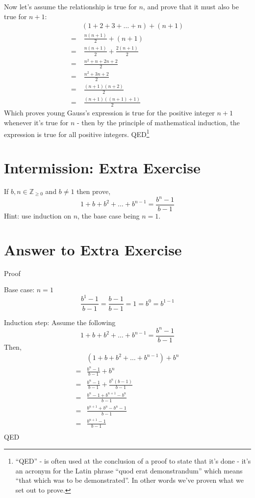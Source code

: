 \documentclass{article}
\begin{document}
Now let's assume the relationship is true for $n$,
and prove that it must also be true for $n+1$:
\begin{align*}
&(1+2+3+\ldots+n) + (n+1)\\
= & \; \frac{n(n+1)}{2} + (n+1)\\
= & \; \frac{n(n+1)}{2} + \frac{2(n+1)}{2}\\
= & \; \frac{n^2+n+2n+2}{2}\\
= & \; \frac{n^2+3n+2}{2}\\
= & \; \frac{(n+1)(n+2)}{2}\\
= & \; \frac{(n+1)((n+1)+1)}{2}
\end{align*}
Which proves young Gauss's expression is true for
the positive integer $n+1$ whenever it's true for $n$ - then
by the principle of mathematical induction,
the expression is true for all positive integers. QED\footnote{``QED'' - is often used at the conclusion of a proof to state that it’s
done - it’s an acronym for the Latin phrase ``quod erat demonstrandum'' which means ``that which was to be demonstrated''.
In other words we’ve proven what we set out to prove.}

\section*{Intermission: Extra Exercise}

If $b, n \in \mathbb{Z}_{\ge 0}$ and $b\ne1$ then prove,
\[1+b+b^2+\dots+b^{n-1} = \frac{b^n-1}{b-1}\]
Hint: use induction on $n$, the base case being $n=1$.

\section*{Answer to Extra Exercise}
Proof

Base case: $n=1$
\[\frac{b^1-1}{b-1}=\frac{b-1}{b-1}=1=b^0=b^{1-1}\]

Induction step:
Assume the following
\[1+b+b^2+\dots+b^{n-1} = \frac{b^n-1}{b-1}\]
Then,
\begin{align*}
&(1+b+b^2+\dots+b^{n-1}) + b^n\\
= &\frac{b^n-1}{b-1}+b^n\\
= &\frac{b^n-1}{b-1}+\frac{b^n(b-1)}{b-1}\\
= &\frac{b^n-1+b^{n+1}-b^n}{b-1}\\
= &\frac{b^{n+1}+b^n-b^n-1}{b-1}\\
= &\frac{b^{n+1}-1}{b-1}\\
\end{align*}
QED
\end{document}
